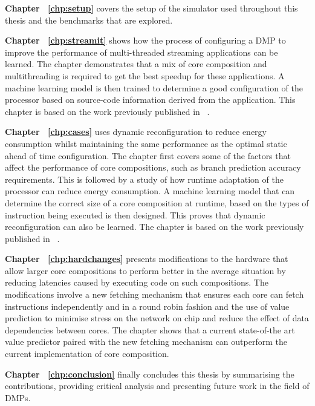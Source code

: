 \textbf{Chapter ~\ref{chp:setup}} covers the setup of the simulator used throughout this thesis and the benchmarks that are explored.

\textbf{Chapter ~\ref{chp:streamit}} shows how the process of configuring a DMP to improve the performance of multi-threaded streaming applications can be learned.
The chapter demonstrates that a mix of core composition and multithreading is required to get the best speedup for these applications.
A machine learning model is then trained to determine a good configuration of the processor based on source-code information derived from the application.
This chapter is based on the work previously published in ~\cite{micolet2016dmpstream}.

\textbf{Chapter ~\ref{chp:cases}} uses dynamic reconfiguration to reduce energy consumption whilst maintaining the same performance as the optimal static ahead of time configuration.
The chapter first covers some of the factors that affect the performance of core compositions, such as branch prediction accuracy requirements.
This is followed by a study of how runtime adaptation of the processor can reduce energy consumption.
A machine learning model that can determine the correct size of a core composition at runtime, based on the types of instruction being executed is then designed.
This proves that dynamic reconfiguration can also be learned.
The chapter is based on the work previously published in ~\cite{micolet2017cases}.

\textbf{Chapter ~\ref{chp:hardchanges}} presents modifications to the hardware that allow larger core compositions to perform better in the average situation by reducing latencies caused by executing code on such compositions.
The modifications involve a new fetching mechanism that ensures each core can fetch instructions independently and in a round robin fashion and the use of value prediction to minimise stress on the network on chip and reduce the effect of data dependencies between cores.
The chapter shows that a current state-of-the art value predictor paired with the new fetching mechanism can outperform the current implementation of core composition.

\textbf{Chapter ~\ref{chp:conclusion}} finally concludes this thesis by summarising the contributions, providing critical analysis and presenting future work in the field of DMPs.